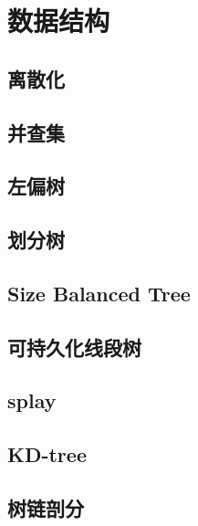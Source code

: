 \section{数据结构}
\subsection{离散化}


\subsection{并查集}








\subsection{左偏树}



\subsection{划分树}



\subsection{Size Balanced Tree}


\subsection{可持久化线段树}


\subsection{splay}


\subsection{KD-tree}


\subsection{树链剖分}


